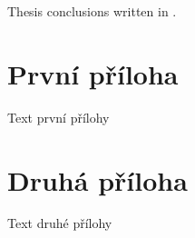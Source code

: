 \documentclass[12pt]{article}
\begin{document}
\begin{upconclusions}[english]
Thesis conclusions written in .
\end{upconclusions}

\appendix
\section{První příloha}
Text první přílohy

\section{Druhá příloha}
Text druhé přílohy

\printglossary

\nocite{*}							%
\printbibliography

%

\printindex
\end{document}
